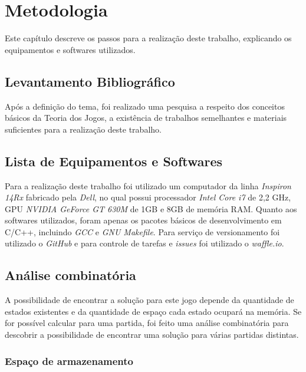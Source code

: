 \chapter[Metodologia]{Metodologia}
\label{cha:metodologia}
	Este capítulo descreve os passos para a realização deste trabalho, explicando os equipamentos e softwares utilizados.

\section{Levantamento Bibliográfico}
\label{sec:levantamento-bibliografico}
Após a definição do tema, foi realizado uma pesquisa a respeito dos conceitos básicos da Teoria dos Jogos, a existência de trabalhos semelhantes e materiais suficientes para a realização deste trabalho.

\section{Lista de Equipamentos e Softwares}
\label{sec:lista-de-equipamentos-e-softwares}

Para a realização deste trabalho foi utilizado um computador da linha \emph{Inspiron 14Rx} fabricado pela \emph{Dell}, no qual possui processador \emph{Intel Core i7} de 2,2 GHz, GPU \emph{NVIDIA GeForce GT 630M} de 1GB e 8GB de memória RAM. Quanto aos softwares utilizados, foram apenas os pacotes básicos de desenvolvimento em C/C++, incluindo \emph{GCC} e \emph{GNU Makefile}. Para serviço de versionamento foi utilizado o \emph{GitHub} e para controle de tarefas e \emph{issues} foi utilizado o \emph{waffle.io}.

\section{Análise combinatória}

A possibilidade de encontrar a solução para este jogo depende da quantidade de estados existentes e da quantidade de espaço cada estado ocupará na memória. Se for possível calcular para uma partida, foi feito uma análise combinatória para descobrir a possibilidade de encontrar uma solução para várias partidas distintas.

\subsection{Espaço de armazenamento}

